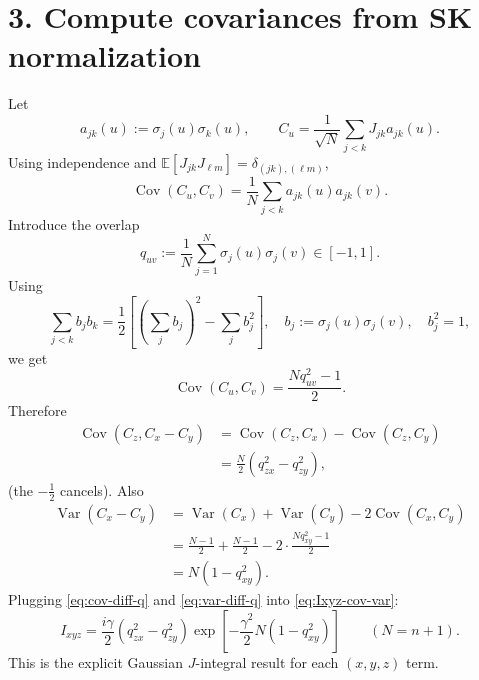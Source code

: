 \documentclass[11pt]{article}
\newcommand{\E}{\mathbb{E}}
\DeclareMathOperator{\Cov}{Cov}
\DeclareMathOperator{\Var}{Var}
\begin{document}
	\section*{3. Compute covariances from SK normalization}
	Let
	\begin{equation}
		a_{jk}(u):=\sigma_j(u)\sigma_k(u),\qquad
		C_u=\frac{1}{\sqrt N}\sum_{j<k}J_{jk}a_{jk}(u).
	\end{equation}
	Using independence and $\E[J_{jk}J_{\ell m}]=\delta_{(jk),(\ell m)}$,
	\begin{equation}
		\Cov(C_u,C_v)
		=
		\frac{1}{N}\sum_{j<k} a_{jk}(u)a_{jk}(v).
		\label{eq:cov-edge-sum}
	\end{equation}
	Introduce the overlap
	\begin{equation}
		q_{uv}:=\frac{1}{N}\sum_{j=1}^{N}\sigma_j(u)\sigma_j(v)\in[-1,1].
		\label{eq:q-def}
	\end{equation}
	Using
	\begin{equation}
		\sum_{j<k} b_j b_k = \frac12\!\left[\left(\sum_j b_j\right)^2-\sum_j b_j^2\right],
		\quad b_j:=\sigma_j(u)\sigma_j(v),\quad b_j^2=1,
	\end{equation}
	we get
	\begin{equation}
		\Cov(C_u,C_v)
		=
		\frac{N q_{uv}^2-1}{2}.
		\label{eq:cov-q}
	\end{equation}
	Therefore
	\begin{align}
		\Cov(C_z, C_x-C_y)
		&=\Cov(C_z,C_x)-\Cov(C_z,C_y)
		\\
		&=\frac{N}{2}\left(q_{zx}^2-q_{zy}^2\right),
		\label{eq:cov-diff-q}
	\end{align}
	(the $-\tfrac12$ cancels).
	Also
	\begin{align}
		\Var(C_x-C_y)
		&=\Var(C_x)+\Var(C_y)-2\Cov(C_x,C_y)
		\\
		&=\frac{N-1}{2}+\frac{N-1}{2}-2\cdot\frac{N q_{xy}^2-1}{2}
		\\
		&=N\left(1-q_{xy}^2\right).
		\label{eq:var-diff-q}
	\end{align}
	Plugging \eqref{eq:cov-diff-q} and \eqref{eq:var-diff-q} into \eqref{eq:Ixyz-cov-var}:
	\begin{equation}
		\boxed{
			I_{xyz}
			=
			\frac{i\gamma}{2}\left(q_{zx}^2-q_{zy}^2\right)
			\exp\!\left[-\frac{\gamma^2}{2}N\left(1-q_{xy}^2\right)\right]
		}
		\qquad (N=n+1).
		\label{eq:Ixyz-final}
	\end{equation}
	This is the explicit Gaussian $J$-integral result for each $(x,y,z)$ term.
	
\end{document}
